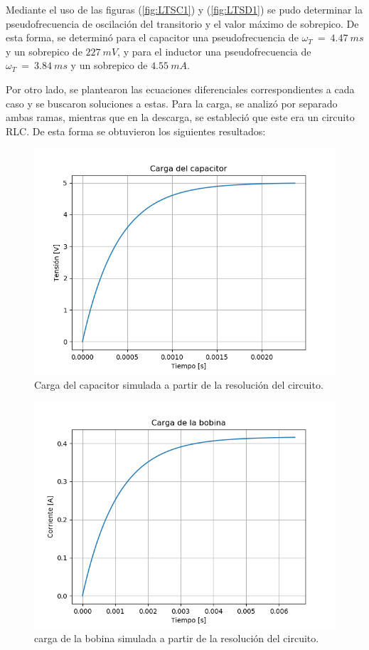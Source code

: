 \documentclass[a4paper]{article}
\begin{document}
Mediante el uso de las figuras (\ref{fig:LTSC1}) y (\ref{fig:LTSD1}) se pudo determinar la pseudofrecuencia de oscilación del transitorio y el valor máximo de sobrepico. De esta forma, se determinó para el capacitor una pseudofrecuencia de ${\omega}_{T} \ = \ 4.47 \ ms$ y un sobrepico de $227 \ mV$, y para el inductor una pseudofrecuencia de ${\omega}_{T} \ = \ 3.84 \ ms$ y un sobrepico de $4.55 \ mA$.

Por otro lado, se plantearon las ecuaciones diferenciales correspondientes a cada caso y se buscaron soluciones a estas. Para la carga, se analizó por separado ambas ramas, mientras que en la descarga, se estableció que este era un circuito RLC. De esta forma se obtuvieron los siguientes resultados:

\begin{figure}[H]
	\centering
	\includegraphics[width=\textwidth]{LTSpice-CargaCSim}
	\caption{Carga del capacitor simulada a partir de la resolución del circuito.}
	\label{fig:LTSCCS}
\end{figure}

\begin{figure}[H]
	\centering
	\includegraphics[width=\textwidth]{LTSpice-CargaLSim}
	\caption{carga de la bobina simulada a partir de la resolución del circuito.}
	\label{fig:LTSCLS}
\end{figure}
\end{document}
